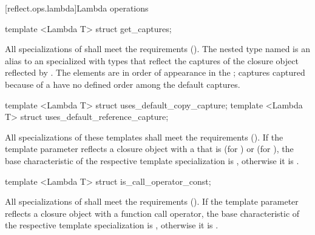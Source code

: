 [reflect.ops.lambda]{Lambda operations}
\begin{std.txt}\color{addclr}
\begin{itemdecl}
template <Lambda T> struct get_captures;
\end{itemdecl}
\begin{itemdescr}
\pnum
      All specializations of  shall meet the
       requirements (). The nested type
      named  is an alias to an  specialized
      with  types that reflect the captures of the closure
      object reflected by .  The elements are in order of appearance
      in the ; captures captured because of a
       have no defined order among the default
      captures.
\end{itemdescr}

\begin{itemdecl}
template <Lambda T> struct uses_default_copy_capture;
template <Lambda T> struct uses_default_reference_capture;
\end{itemdecl}
\begin{itemdescr}
\pnum
      All specializations of these templates shall meet the
       requirements (). If the template
      parameter reflects a closure object with a 
      that is \tcode{=} (for ) or \tcode{\&}
      (for ), the base characteristic of
      the respective template specialization is , otherwise it
      is .
\end{itemdescr}

\begin{itemdecl}
template <Lambda T> struct is_call_operator_const;
\end{itemdecl}
\begin{itemdescr}
\pnum
      All specializations of  shall meet the
       requirements (). If the template
      parameter reflects a closure object with a  function call
      operator, the base characteristic of the respective template
      specialization is , otherwise it is .
\end{itemdescr}
\end{std.txt}


